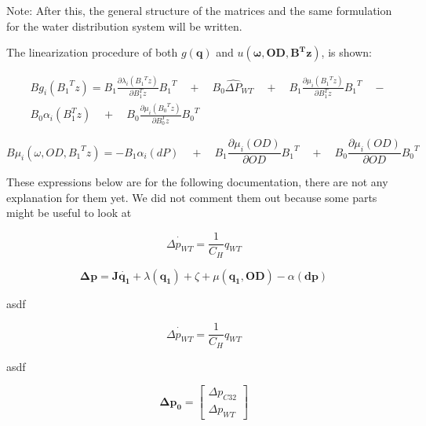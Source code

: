Note: 
After this, the general structure of the matrices and the same formulation for the water distribution system will be written. 

The linearization procedure of both $g(\pmb{q})$ and $u(\pmb{\omega},\pmb{OD}, \pmb{B^T z})$, is shown:

\begin{equation}
  \begin{split}
  & B g_{i}({B_{1}}^{T}z) = B_1 \frac{\partial{\lambda_{i}({{B_{1}}^{T}z})}}{\partial{B_{1}^{T}z}} {B_1}^{T} \quad + \quad
  B_0 {\hat{\Delta P}}_{WT} \quad + \quad B_1 \frac{\partial{\mu_{i}({{B_{1}}^{T}z})}}{\partial{B_{1}^{T}z}} {B_1}^{T} \quad - \\
  &  B_0 \alpha_{i}(B_{1}^{T}z) \quad + \quad B_0 \frac{\partial{\mu_{i}({{B_{0}}^{T}z})}}{\partial{B_{0}^{T}z}} {B_0}^{T}
  \end{split}
  \label{StateLinear}
\end{equation}

\begin{equation}
  B \mu_{i}(\omega, OD, {B_1}^{T}z) = - B_1 \alpha_{i}(dP) \quad + \quad B_1 \frac{\partial{\mu_{i}(OD)}}{\partial{OD}} {B_1}^{T}
  \quad + \quad B_0 \frac{\partial{\mu_{i}(OD)}}{\partial{OD}} {B_0}^{T}
  \label{inputlinear}
\end{equation}



These expressions below are for the following documentation, there are not any explanation for them yet. We did not comment them out because some parts might be useful to look at


\begin{equation}
 \dot{\Delta p_{WT}} = \frac{1}{C_H} q_{WT}
\label{WTeq1}
\end{equation}

\begin{equation}
 \pmb{ \Delta p} = \pmb{J \dot{q_1}} + \lambda(\pmb{q_1}) + \zeta + \mu(\pmb{q_1}, \pmb{OD}) - \alpha(\pmb{dp})
\label{NonlinearPressureFunction}
\end{equation}

asdf

\begin{equation}
 \dot{\Delta p_{WT}} = \frac{1}{C_H} q_{WT}
\label{WTeq2}
\end{equation}

asdf

\begin{equation}
\pmb{\Delta p_0} =
\begin{bmatrix}
         \Delta p_{C32} \\
	\Delta p_{WT}
\end{bmatrix}
\label{pvector}
\end{equation}

